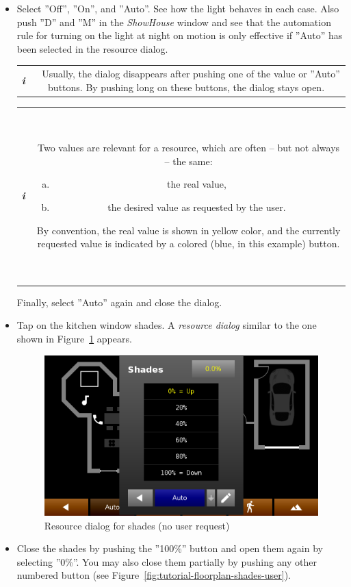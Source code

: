 \documentclass[12pt,english,parskip=half,headheight=19pt]{scrreprt}
\newcommand{\infobox}[1]{
  \par
  \medskip
  \hfill
  \setlength\arrayrulewidth{1pt}
  \begin{tabular}[t]{c|c|}
    \parbox{1.8em}{\hfill\textit{\Huge\textbf{i}\,}}
    &
    \,\parbox{0.89\linewidth}{\setlength{\parskip}{0.5em} \small #1}\,
  \end{tabular}
  \medskip
  \par
}
\begin{document}
\begin{itemize}[$\blacktriangleright$]
  \item
    Select ''Off'', ''On'', and ''Auto''. See how the light behaves in each case.
    Also push ''D'' and ''M'' in the \textit{ShowHouse} window and see that the automation
    rule for turning on the light at night on motion is only effective if ''Auto'' has
    been selected in the resource dialog.
    \infobox{
      Usually, the dialog disappears after pushing one of the value or ''Auto'' buttons.
      By pushing long on these buttons, the dialog stays open.
    }
    \infobox{
      Two values are relevant for a resource, which are often -- but not always -- the same:
      \begin{enumerate}[a)]
        \item the real value,
        \item the desired value as requested by the user.
      \end{enumerate}
      By convention, the real value is shown in yellow color, and the currently requested value
      is indicated by a colored (blue, in this example) button.
    }
    Finally, select ''Auto'' again and close the dialog.

  \item
    Tap on the kitchen window shades. A \textit{resource dialog} similar to the one shown in
    Figure~\ref{fig:tutorial-floorplan-shades-auto} appears.

    \begin{figure}[ht]
      \centering
      \includegraphics[width=0.65\linewidth]{figs/wallclock-floorplan-shades-auto.png}
      \caption[l]{Resource dialog for shades (no user request)}
      \label{fig:tutorial-floorplan-shades-auto}
    \end{figure}

  \item
    Close the shades by pushing the ''100\%'' button and open them again by selecting
    ''0\%''. You may also close them partially by pushing any other numbered button
    (see Figure~\ref{fig:tutorial-floorplan-shades-user}).


\end{itemize}
\end{document}
